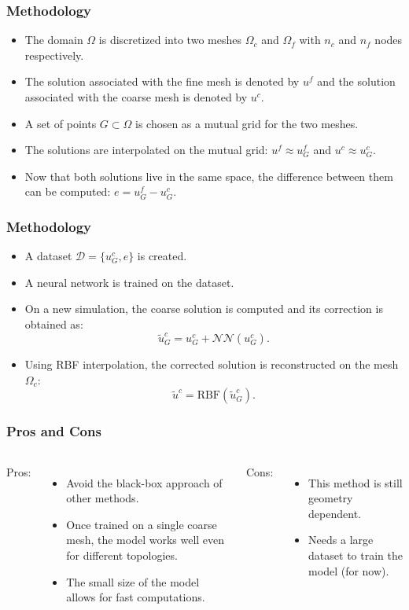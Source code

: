 \documentclass{beamer}
\begin{document}
\begin{frame}
\frametitle{Methodology}
\begin{itemize}
    \item The domain \( \Omega \) is discretized into two meshes \( \Omega_c \) and \( \Omega_f \) with \( n_c \) and \( n_f \) nodes respectively. 
    \item The solution associated with the fine mesh is denoted by \( u^f \) and the solution associated with the coarse mesh is denoted by \( u^c \).
    \item A set of points \(G \subset \Omega\) is chosen as a mutual grid for the two meshes.
    \item The solutions are interpolated on the mutual grid: \( u^f \approx u^f_G \) and \( u^c \approx u^c_G \).
    \item Now that both solutions live in the same space, the difference between them can be computed: \( e = u^f_G - u^c_G \).
\end{itemize}
\end{frame}

\begin{frame}
\frametitle{Methodology}
\begin{itemize}
    \item A dataset \(\mathcal{D} = \{u_G^c, e\}\) is created.
    \item A neural network is trained on the dataset.
    \item On a new simulation, the coarse solution is computed and its correction is obtained as: 
    \[
        \tilde{u}_G^c = u_G^c + \mathcal{NN}(u_G^c).
    \]
    \item Using RBF interpolation, the corrected solution is reconstructed on the mesh \( \Omega_c \):
    \[
        \tilde{u}^c = \text{RBF}(\tilde{u}_G^c).
    \]
\end{itemize}
\end{frame}

\begin{frame}
\frametitle{Pros and Cons}
\begin{columns}
    Pros:
    \begin{itemize}
        \item Avoid the black-box approach of other methods.
        \item Once trained on a single coarse mesh, the model works well even for different topologies.
        \item The small size of the model allows for fast computations.
    \end{itemize}
    Cons:
    \begin{itemize}
        \item This method is still geometry dependent.
        \item Needs a large dataset to train the model (for now).
    \end{itemize}
\end{columns}
\end{frame}
\end{document}
